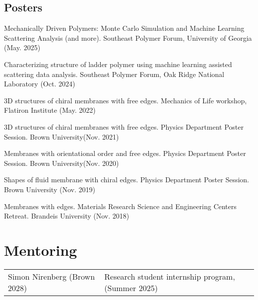 \documentclass[11pt,letterpaper]{article}
\begin{document}
\subsection*{Posters}
\begin{etaremune}
    \item Mechanically Driven Polymers: Monte Carlo Simulation and Machine Learning Scattering Analysis (and more). Southeast Polymer Forum, University of Georgia  (May. 2025)
    \item Characterizing structure of ladder polymer using machine learning assisted scattering data analysis. Southeast Polymer Forum, Oak Ridge National Laboratory (Oct. 2024)
    \item 3D structures of chiral membranes with free edges. Mechanics of Life workshop, Flatiron Institute (May. 2022)
    \item 3D structures of chiral membranes with free edges. Physics Department Poster Session. Brown University(Nov. 2021)
    \item Membranes with orientational order and free edges. Physics Department Poster Session. Brown University(Nov. 2020)
    \item Shapes of fluid membrane with chiral edges. Physics Department Poster Session. Brown University (Nov. 2019)
    \item Membranes with edges. Materials Research Science and Engineering Centers Retreat. Brandeis University (Nov. 2018)
\end{etaremune}


\section*{Mentoring}
\vspace*{-0.15in}
\begin{longtable}{l p{\linewidth}}
    Simon Nirenberg (Brown 2028) & Research student internship program, (Summer 2025)
\end{longtable}
\end{document}
